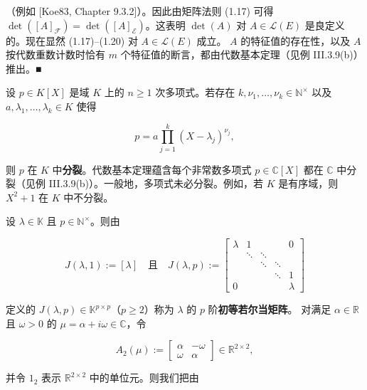 \begin{remark}
\begin{items}
（例如 [Koe83, Chapter 9.3.2]）。因此由矩阵法则 (1.17) 可得 $ \det([A]_{\mathcal{F}}) = \det([A]_{\mathcal{E}}) $。这表明 $ \det(A) $ 对 $ A \in \mathcal{L}(E) $ 是良定义的。现在显然 (1.17)–(1.20) 对 $ A \in \mathcal{L}(E) $ 成立。
$ A $ 的特征值的存在性，以及 $ A $ 按代数重数计数时恰有 $ m $ 个特征值的断言，都由代数基本定理（见例 III.3.9(b)）推出。\nobreak\hspace{0.35em}■

\item

设 $ p \in K[X] $ 是域 $ K $ 上的 $ n \ge 1 $ 次多项式。若存在 $ k, \nu_{1},\ldots,\nu_{k} \in \mathbb{N}^{\times} $ 以及 $ a, \lambda_{1},\ldots,\lambda_{k} \in K $ 使得

\[
p = a\prod_{j=1}^{k}(X - \lambda_{j})^{\nu_{j}} ,
\]

则 $ p $ 在 $ K $ 中\textbf{分裂}。代数基本定理蕴含每个非常数多项式 $ p \in \mathbb{C}[X] $ 都在 $ \mathbb{C} $ 中分裂（见例 III.3.9(b)）。一般地，多项式未必分裂。例如，若 $ K $ 是有序域，则 $ X^{2} + 1 $ 在 $ K $ 中不分裂。

\item

设 $ \lambda \in \mathbb{K} $ 且 $ p \in \mathbb{N}^{\times} $。则由

\begin{equation*}
J(\lambda,1) := [\lambda] \quad \text{且} \quad J(\lambda,p) := \begin{bmatrix} \lambda & 1 & & & 0 \\ & \ddots & \ddots & & \\ & & \ddots & \ddots & \\ & & & \ddots & 1 \\ 0 & & & & \lambda \end{bmatrix}
\end{equation*}

定义的 $ J(\lambda,p) \in \mathbb{K}^{p\times p} $（$ p \ge 2 $）称为 $ \lambda $ 的 $ p $ 阶\textbf{初等若尔当矩阵}。
对满足 $ \alpha \in \mathbb{R} $ 且 $ \omega > 0 $ 的 $ \mu = \alpha + i\omega \in \mathbb{C} $，令

\begin{equation*}
A_{2}(\mu) := \begin{bmatrix} \alpha & -\omega \\ \omega & \alpha \end{bmatrix} \in \mathbb{R}^{2\times 2} ,
\end{equation*}

并令 $ 1_{2} $ 表示 $ \mathbb{R}^{2\times 2} $ 中的单位元。则我们把由


\end{items}
\end{remark}
